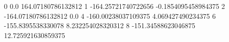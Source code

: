 0 0.0 164.07180786132812
1 -164.25721740722656 -0.1854095458984375
2 -164.07180786132812 0.0
4 -160.00238037109375 4.069427490234375
6 -155.8395538330078 8.232254028320312
8 -151.34588623046875 12.725921630859375
